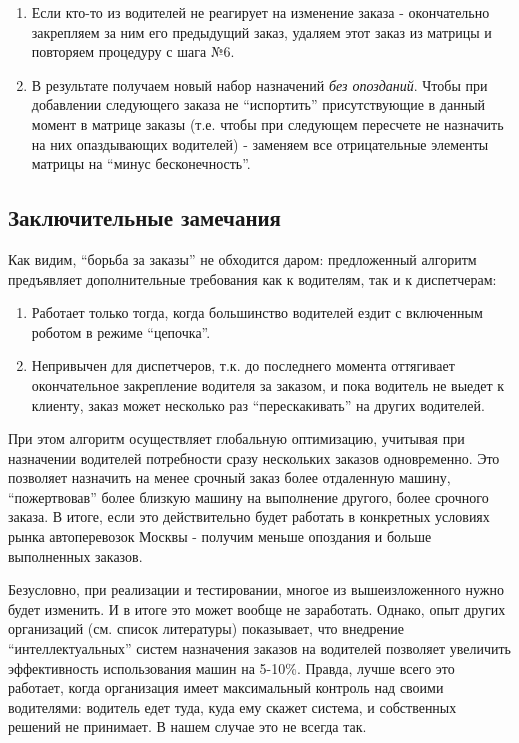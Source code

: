 \begin{enumerate}
				\item{Если кто-то из водителей не реагирует на изменение заказа - окончательно закрепляем за ним его предыдущий заказ, удаляем этот заказ из матрицы и повторяем процедуру с шага №6.}

				\item{В результате получаем новый набор назначений \textit{без опозданий}. Чтобы при добавлении следующего заказа не “испортить” присутствующие в данный момент в матрице заказы (т.е. чтобы при следующем пересчете не назначить на них опаздывающих водителей) - заменяем все отрицательные элементы матрицы на “минус бесконечность”.}
			\end{enumerate}

	\subsection{Заключительные замечания}

		Как видим, “борьба за заказы” не обходится даром: предложенный алгоритм предъявляет дополнительные требования как к водителям, так и к диспетчерам:

		\begin{enumerate}
			\item{Работает только тогда, когда большинство водителей ездит с включенным роботом в режиме “цепочка”.}

			\item{Непривычен для диспетчеров, т.к. до последнего момента оттягивает окончательное закрепление водителя за заказом, и пока водитель не выедет к клиенту, заказ может несколько раз “перескакивать” на других водителей.}
		\end{enumerate}

		При этом алгоритм осуществляет глобальную оптимизацию, учитывая при назначении водителей потребности сразу нескольких заказов одновременно. Это позволяет назначить на менее срочный заказ более отдаленную машину, “пожертвовав” более близкую машину на выполнение другого, более срочного заказа. В итоге, если это действительно будет работать в конкретных условиях рынка автоперевозок Москвы - получим меньше опоздания и больше выполненных заказов.

		Безусловно, при реализации и тестировании, многое из вышеизложенного нужно будет изменить. И в итоге это может вообще не заработать. Однако, опыт других организаций (см. список литературы) показывает, что внедрение “интеллектуальных” систем назначения заказов на водителей позволяет увеличить эффективность использования машин на 5-10\%. Правда, лучше всего это работает, когда организация имеет максимальный контроль над своими водителями: водитель едет туда, куда ему скажет система, и собственных решений не принимает. В нашем случае это не всегда так.

